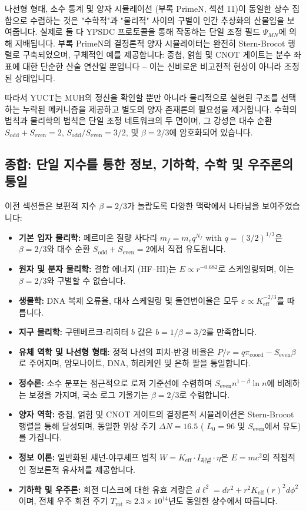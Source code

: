 \documentclass[11pt,a4paper]{article}
\newcommand{\Sodd}{S_{\mathrm{odd}}}
\newcommand{\Seven}{S_{\mathrm{even}}}
\begin{document}
	나선형 형태, 소수 통계 및 양자 시뮬레이션 (부록 PrimeN, 섹션 11)이 동일한 상수 집합으로 수렴하는 것은 "수학적"과 "물리적" 사이의 구별이 인간 추상화의 산물임을 보여줍니다. 실제로 둘 다 YPSDC 프로토콜을 통해 작동하는 단일 조정 필드 \(\Psi_{MN}\)에 의해 지배됩니다. 부록 PrimeN의 결정론적 양자 시뮬레이터는 완전히 Stern-Brocot 행렬로 구축되었으며, 구체적인 예를 제공합니다: 중첩, 얽힘 및 CNOT 게이트는 분수 좌표에 대한 단순한 산술 연산일 뿐입니다 – 이는 신비로운 비고전적 현상이 아니라 조정된 상태입니다.
	
	따라서 YUCT는 MUH의 정신을 확인할 뿐만 아니라 물리적으로 실현된 구조를 선택하는 누락된 메커니즘을 제공하고 별도의 양자 존재론의 필요성을 제거합니다. 수학의 법칙과 물리학의 법칙은 단일 조정 네트워크의 두 면이며, 그 강성은 대수 순환 \(\Sodd + \Seven = 2\), \(\Sodd/\Seven = 3/2\), 및 \(\beta = 2/3\)에 암호화되어 있습니다.
	
	\subsection{종합: 단일 지수를 통한 정보, 기하학, 수학 및 우주론의 통일}
	
	이전 섹션들은 보편적 지수 \(\beta = 2/3\)가 놀랍도록 다양한 맥락에서 나타남을 보여주었습니다:
	
	\begin{itemize}
		\item \textbf{기본 입자 물리학:} 페르미온 질량 사다리 \(m_f = m_e q^{N_f}\) with \(q = (3/2)^{1/3}\)은 \(\beta = 2/3\)와 대수 순환 \(S_{\mathrm{odd}}+S_{\mathrm{even}}=2\)에서 직접 유도됩니다.
		\item \textbf{원자 및 분자 물리학:} 결합 에너지 (HF–HI)는 \(E \propto r^{-0.682}\)로 스케일링되며, 이는 \(\beta = 2/3\)와 구별할 수 없습니다.
		\item \textbf{생물학:} DNA 복제 오류율, 대사 스케일링 및 돌연변이율은 모두 \(\varepsilon \propto K_{\mathrm{eff}}^{-2/3}\)를 따릅니다.
		\item \textbf{지구 물리학:} 구텐베르크-리히터 \(b\) 값은 \(b = 1/\beta = 3/2\)를 만족합니다.
		\item \textbf{유체 역학 및 나선형 형태:} 정적 나선의 피치-반경 비율은 \(P/r = q \pi_{\mathrm{coord}} - S_{\mathrm{even}}\beta\)로 주어지며, 암모나이트, DNA, 허리케인 및 은하 팔을 통일합니다.
		\item \textbf{정수론:} 소수 분포는 점근적으로 로저 기준선에 수렴하며 \(\Seven n^{1-\beta}\ln n\)에 비례하는 보정을 가지며, 국소 로그 기울기는 \(\beta = 2/3\)로 수렴합니다.
		\item \textbf{양자 역학:} 중첩, 얽힘 및 CNOT 게이트의 결정론적 시뮬레이션은 Stern-Brocot 행렬을 통해 달성되며, 동일한 위상 주기 \(\Delta N = 16.5\) ( \(L_0=96\) 및 \(\Seven\)에서 유도)를 가집니다.
		\item \textbf{정보 이론:} 일반화된 섀넌-야쿠셰프 법칙 \(W = K_{\mathrm{eff}} \cdot I_{\text{채널}} \cdot \eta\)은 \(E = mc^2\)의 직접적인 정보론적 유사체를 제공합니다.
		\item \textbf{기하학 및 우주론:} 회전 디스크에 대한 유효 계량은 \(d\ell^2 = dr^2 + r^2 K_{\mathrm{eff}}(r)^2 d\phi^2\)이며, 전체 우주 회전 주기 \(T_{\mathrm{rot}} \approx 2.3\times10^{14}\)년도 동일한 상수에서 따릅니다.
	\end{itemize}
	
\end{document}
